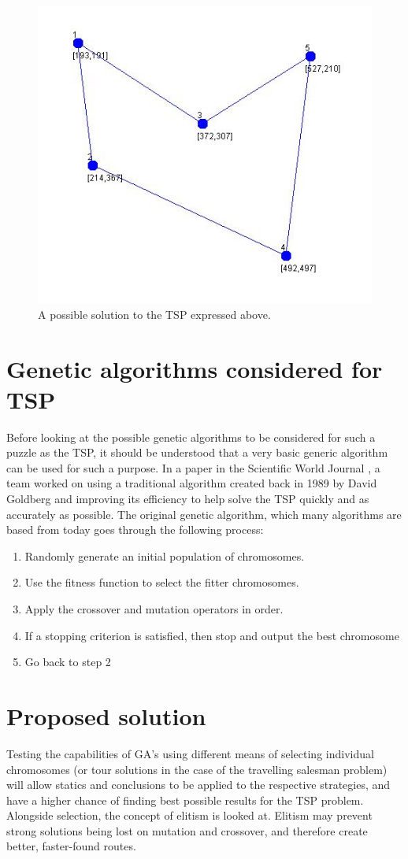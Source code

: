 \documentclass[article]{IEEEtran}
\begin{document}
\begin{figure}
\centering
  \includegraphics[width=.8\linewidth]{images/solution}
  \caption{A possible solution to the TSP expressed above.}
  \label{fig:2}
\end{figure}

\section{Genetic algorithms considered for TSP}
Before looking at the possible genetic algorithms to be considered for such a puzzle as the TSP, it should be understood that a very basic generic algorithm can be used for such a purpose. In a paper in the Scientific World Journal \cite{4}, a team worked on using a traditional algorithm created back in 1989 by David Goldberg \cite{5} and improving its efficiency to help solve the TSP quickly and as accurately as possible. The original genetic algorithm, which many algorithms are based from today goes through the following process:
\begin{enumerate}
\item Randomly generate an initial population of chromosomes.
\item Use the fitness function to select the fitter chromosomes.
\item Apply the crossover and mutation operators in order. 
\item If a stopping criterion is satisfied, then stop and output the best chromosome
\item Go back to step 2
\end{enumerate}

\section{Proposed solution}
Testing the capabilities of GA's using different means of selecting individual chromosomes (or tour solutions in the case of the travelling salesman problem) will allow statics and conclusions to be applied to the respective strategies, and have a higher chance of finding best possible results for the TSP problem. Alongside selection, the concept of elitism is looked at. Elitism may prevent strong solutions being lost on mutation and crossover, and therefore create better, faster-found routes. 
\end{document}
